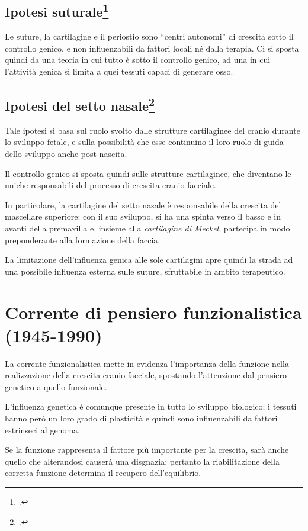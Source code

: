 \subsection*{Ipotesi suturale\protect\footcite{Weinmann1956}}
Le suture, la cartilagine e il periostio sono ``centri autonomi'' di crescita sotto il controllo genico, e non influenzabili da fattori locali né dalla terapia. Ci si sposta quindi da una teoria in cui tutto è sotto il controllo genico, ad una in cui l'attività genica si limita a quei tessuti capaci di generare osso.

\subsection*{Ipotesi del setto nasale\protect\footcite{Scott1967}}
Tale ipotesi si basa sul ruolo svolto dalle strutture cartilaginee del cranio durante lo sviluppo fetale, e sulla possibilità che esse continuino il loro ruolo di guida dello sviluppo anche post-nascita.

Il controllo genico si sposta quindi sulle strutture cartilaginee, che diventano le uniche responsabili del processo di crescita cranio-facciale.

In particolare, la cartilagine del setto nasale è responsabile della crescita del mascellare superiore: con il suo sviluppo, si ha una spinta verso il basso e in avanti della premaxilla e, insieme alla \textit{cartilagine di Meckel}, partecipa in modo preponderante alla formazione della faccia.

La limitazione dell'influenza genica alle sole cartilagini apre quindi la strada ad una possibile influenza esterna sulle suture, sfruttabile in ambito terapeutico.

\section{Corrente di pensiero funzionalistica (1945-1990)}
La corrente funzionalistica mette in evidenza l'importanza della funzione nella realizzazione della crescita cranio-facciale, spostando l'attenzione dal pensiero genetico a quello funzionale.

L'influenza genetica è comunque presente in tutto lo sviluppo biologico; i tessuti hanno però un loro grado di plasticità e quindi sono influenzabili da fattori estrinseci al genoma.

Se la funzione rappresenta il fattore più importante per la crescita, sarà anche quello che alterandosi causerà una disgnazia; pertanto la riabilitazione della corretta funzione determina il recupero dell'equilibrio.

